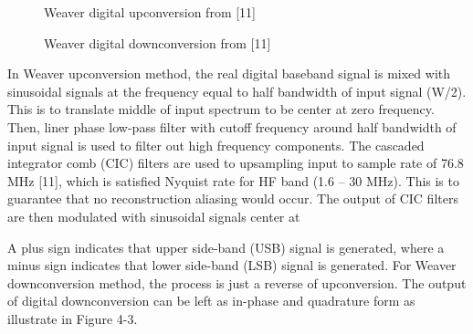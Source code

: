 \documentclass[conference]{IEEEtran}
\begin{document}
\begin{figure}[h!]
	\centering
	\caption{Weaver digital upconversion from [11]}
	\label{fig:4-2}
\end{figure}

\begin{figure}[h!]
	\centering
	\caption{Weaver digital downconversion from [11]}
	\label{fig:4-3}
\end{figure}

In Weaver upconversion method, the real digital baseband signal is mixed with sinusoidal signals at the frequency equal to half bandwidth of input signal (W/2). This is to translate middle of input spectrum to be center at zero frequency. Then, liner phase low-pass filter with cutoff frequency around half bandwidth of input signal is used to filter out high frequency components. The cascaded integrator comb (CIC) filters are used to upsampling input to sample rate of 76.8 MHz [11], which is satisfied Nyquist rate for HF band (1.6 – 30 MHz). This is to guarantee that no reconstruction aliasing would occur. The output of CIC filters are then modulated with sinusoidal signals center at
\begin{figure}[h!]
	\centering
\end{figure}
A plus sign indicates that upper side-band (USB) signal is generated, where a minus sign indicates that lower side-band (LSB) signal is generated. For Weaver downconversion method, the process is just a reverse of upconversion. The output of digital downconversion can be left as in-phase and quadrature form as illustrate in Figure 4-3. 
\end{document}
